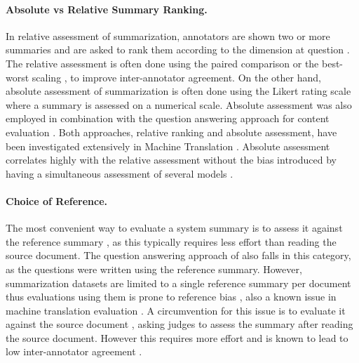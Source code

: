 \documentclass[11pt,a4paper]{article}
\begin{document}
\paragraph{Absolute vs Relative Summary Ranking.} 
In relative assessment of summarization, 
annotators are shown two or more summaries and are asked to rank them according to the dimension at question \citep{Yang2017b,Chen2018a,narayan-sidenet18,Guo2018a,Krishna2018a}. The relative assessment is often done using the paired comparison \citep{Thurstone1994} or the best-worst scaling \citep{Woodworth1991,Louviere2015}, to improve inter-annotator agreement. On the other hand,
absolute assessment of summarization \cite{Li2018a,Song2018,Kryscinski2018,Hsu2018,Hardy2018} 
is often done using the Likert rating scale \citep{Likert1932} where a summary is assessed on a numerical scale. 
Absolute assessment was also employed in combination with the question answering approach for content evaluation
\citep{narayan18xsum,Narayan2018}. Both approaches, relative ranking and absolute assessment, have been investigated extensively in Machine Translation \citep{Bojar2016, Bojar2017}. %
 Absolute assessment correlates highly with the relative assessment without the bias introduced by having a simultaneous assessment of several models \citep{Bojar2011}. %

\paragraph{Choice of Reference.} 
The most convenient
way to evaluate a system summary is to assess it against the reference summary \citep{Celikyilmaz2018,Yang2017b,Peyrard2018a}, as this typically requires less effort than reading the source document. The question answering approach of \citet{narayan18xsum,Narayan2018} also falls in this category, as the questions were written using the reference summary. However, summarization datasets are limited to a single reference summary per document \citep{Sandhaus2008,Hermann2015,newsroom_N181065,narayan18xsum} thus evaluations using them
is prone to reference bias \citep{Louis2013}, also a known issue in machine translation evaluation \citep{fomicheva2016reference}. A circumvention for this issue is to evaluate it against the source document \citep{Song2018,narayan-sidenet18,Hsu2018,Kryscinski2018}, asking judges to assess the summary after reading the source document. However this requires more effort and is known to lead to low inter-annotator agreement \citep{Nenkova2004a}. 
\end{document}
